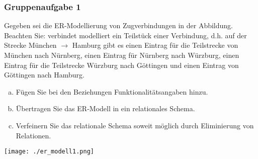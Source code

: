 \begin{frame}
	\frametitle{Gruppenaufgabe 1}
	\vspace{0.5cm}

	\begin{multicols}{2}
		Gegeben sei die ER-Modellierung von Zugverbindungen in der Abbildung.
		Beachten Sie: verbindet modelliert ein Teilstück einer Verbindung,
		d.h. auf der Strecke München \( \rightarrow \) Hamburg gibt es einen Eintrag für
		die Teilstrecke von München nach Nürnberg,
		einen Eintrag für Nürnberg nach Würzburg,
		einen Eintrag für die Teilstrecke Würzburg nach Göttingen und einen Eintrag von Göttingen nach Hamburg.
		\begin{enumerate}[a)]
			\item<1-> Fügen Sie bei den Beziehungen Funktionalitätsangaben hinzu.
			\item<2-> Übertragen Sie das ER-Modell in ein relationales Schema.
			\item<3-> Verfeinern Sie das relationale Schema soweit möglich durch Eliminierung von Relationen.
		\end{enumerate}

		\vfill\columnbreak
		\begin{center}
			\texttt{[image: ./er\_modell1.png]}
		\end{center}
	\end{multicols}
\end{frame}


